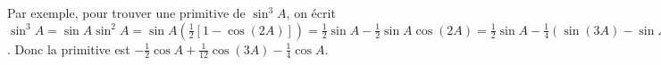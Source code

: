 ﻿Par exemple, pour trouver une primitive de $\sin^3{A}$, on écrit $\sin^3{A} = \sin{A}\sin^2{A} = \sin{A}(\frac{1}{2}[1-\cos(2A)]) = \frac{1}{2}\sin{A} - \frac{1}{2}\sin{A}\cos(2A) = \frac{1}{2}\sin{A} - \frac{1}{4}(\sin(3A) - \sin{A})$. Donc la primitive est $-\frac{1}{2}\cos{A} + \frac{1}{12}\cos(3A) - \frac{1}{4}\cos{A}$.
